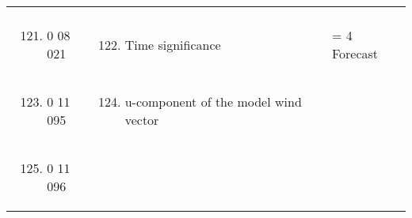 \begin{longtable}[]{@{}llll@{}}
\begin{minipage}[t]{0.22\columnwidth}
\strut
\end{minipage}\tabularnewline
\begin{minipage}[t]{0.22\columnwidth}\raggedright
\strut
\end{minipage} & \begin{minipage}[t]{0.22\columnwidth}\raggedright
\begin{enumerate}
\setcounter{enumi}{120}
\item
  0 08 021
\end{enumerate}\strut
\end{minipage} & \begin{minipage}[t]{0.22\columnwidth}\raggedright
\begin{enumerate}
\setcounter{enumi}{121}
\item
  Time significance
\end{enumerate}\strut
\end{minipage} & \begin{minipage}[t]{0.22\columnwidth}\raggedright
= 4 Forecast\strut
\end{minipage}\tabularnewline
\begin{minipage}[t]{0.22\columnwidth}\raggedright
\strut
\end{minipage} & \begin{minipage}[t]{0.22\columnwidth}\raggedright
\begin{enumerate}
\setcounter{enumi}{122}
\item
  0 11 095
\end{enumerate}\strut
\end{minipage} & \begin{minipage}[t]{0.22\columnwidth}\raggedright
\begin{enumerate}
\setcounter{enumi}{123}
\item
  u-component of the model wind vector
\end{enumerate}\strut
\end{minipage} & \begin{minipage}[t]{0.22\columnwidth}\raggedright
\strut
\end{minipage}\tabularnewline
\begin{minipage}[t]{0.22\columnwidth}\raggedright
\strut
\end{minipage} & \begin{minipage}[t]{0.22\columnwidth}\raggedright
\begin{enumerate}
\setcounter{enumi}{124}
\item
  0 11 096
\end{enumerate}\strut

\end{minipage}
\end{longtable}
